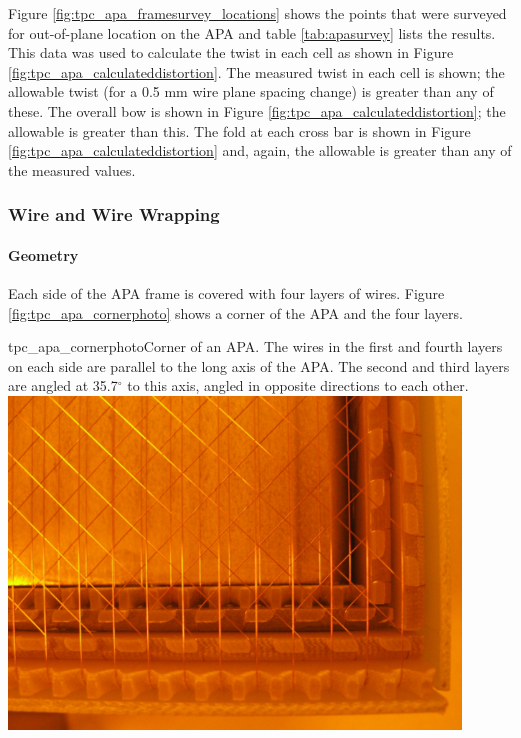 Figure \ref{fig:tpc_apa_framesurvey_locations} shows the points that were surveyed for out-of-plane location on the APA and table \ref{tab:apasurvey} lists the results.  This data was used to calculate the twist in each cell as shown in Figure  \ref{fig:tpc_apa_calculateddistortion}. The measured twist in each cell is shown; the allowable twist (for a 0.5 mm wire plane spacing change) is greater than any of these.  The overall bow is shown in Figure \ref{fig:tpc_apa_calculateddistortion}; the allowable is greater than this.  The fold at each cross bar is shown in Figure \ref{fig:tpc_apa_calculateddistortion} and, again, the allowable is greater than any of the measured values. 



\subsubsection{Wire and Wire Wrapping}

\paragraph{Geometry}

Each side of the APA frame is covered with four layers of wires.  Figure \ref{fig:tpc_apa_cornerphoto} shows a corner of the APA and the four layers.

\begin{cdrfigure}{tpc_apa_cornerphoto}{Corner of an APA.  The wires in the first and fourth layers on each side are parallel to the long axis of the APA.  The second and third layers are angled at 35.7$^{\circ}$ to this axis, angled in opposite directions to each other.}
\includegraphics[width=0.9\textwidth]{figures/tpc_apa_cornerphoto.png} 
\end{cdrfigure}

